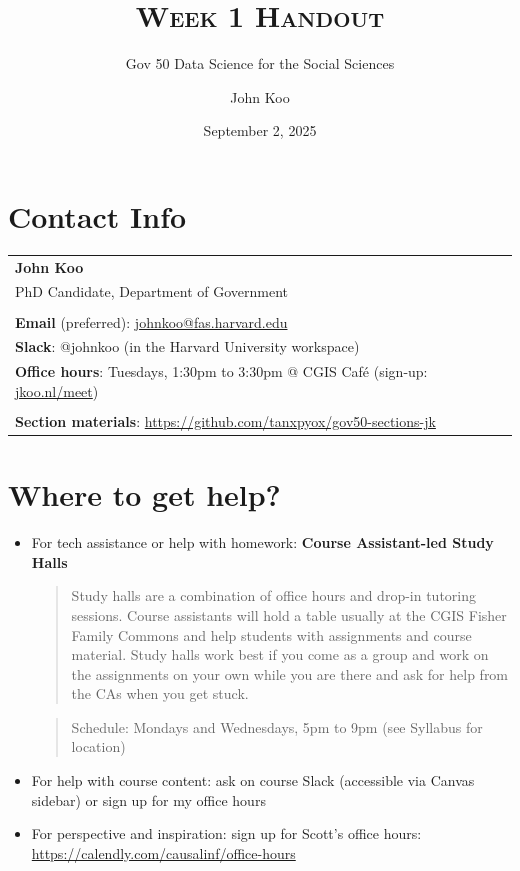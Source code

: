 \documentclass[
  11pt,
  letterpaper]{article}
\title{\textsc{Week 1 Handout}}
\subtitle{Gov 50 Data Science for the Social Sciences}
\author{John Koo}
\date{September 2, 2025}
\begin{document}
\maketitle

\section{Contact Info}\label{contact-info}

\begin{table}[!h]

\centering

\begin{tabular}{l}
  \textbf{John Koo} \\
  PhD Candidate, Department of Government \\ \\
  
  \textbf{Email} (preferred): \href{mailto:johnkoo@fas.harvard.edu}{johnkoo@fas.harvard.edu} \\
  \textbf{Slack}: @johnkoo (in the Harvard University workspace) \\
  \textbf{Office hours}: Tuesdays, 1:30pm to 3:30pm @ CGIS Caf\'e (sign-up: \href{https://jkoo.nl/meet}{jkoo.nl/meet}) \\ \\ 
  \textbf{Section materials}: \url{https://github.com/tanxpyox/gov50-sections-jk}
  
  \end{tabular}
\end{table}

\section{Where to get help?}\label{where-to-get-help}

\begin{itemize}
\item
  For tech assistance or help with homework: \textbf{Course
  Assistant-led Study Halls}

  \begin{quote}
  Study halls are a combination of office hours and drop-in tutoring
  sessions. Course assistants will hold a table usually at the CGIS
  Fisher Family Commons and help students with assignments and course
  material. Study halls work best if you come as a group and work on the
  assignments on your own while you are there and ask for help from the
  CAs when you get stuck.
  \end{quote}

  \begin{quote}
  Schedule: Mondays and Wednesdays, 5pm to 9pm (see Syllabus for
  location)
  \end{quote}
\item
  For help with course content: ask on course Slack (accessible via
  Canvas sidebar) or sign up for my office hours
\item
  For perspective and inspiration: sign up for Scott's office hours:
  \url{https://calendly.com/causalinf/office-hours}
\end{itemize}
\end{document}

